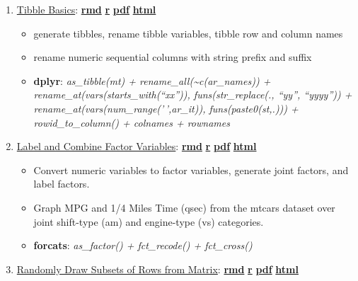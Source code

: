 \documentclass[
]{book}
\providecommand{\tightlist}{%
  \setlength{\itemsep}{0pt}\setlength{\parskip}{0pt}}
\begin{document}
\begin{enumerate}
\def\labelenumi{\arabic{enumi}.}
\tightlist
\item
  \href{https://fanwangecon.github.io/R4Econ/amto/tibble/htmlpdfr/fs_tib_basics.html}{Tibble Basics}: \href{https://github.com/FanWangEcon/R4Econ/blob/master/amto/tibble//fs_tib_basics.Rmd}{\textbf{rmd}} \textbar{} \href{https://github.com/FanWangEcon/R4Econ/blob/master/amto/tibble/htmlpdfr/fs_tib_basics.R}{\textbf{r}} \textbar{} \href{https://github.com/FanWangEcon/R4Econ/blob/master/amto/tibble/htmlpdfr/fs_tib_basics.pdf}{\textbf{pdf}} \textbar{} \href{https://fanwangecon.github.io/R4Econ/amto/tibble/htmlpdfr/fs_tib_basics.html}{\textbf{html}}

  \begin{itemize}
  \tightlist
  \item
    generate tibbles, rename tibble variables, tibble row and column names
  \item
    rename numeric sequential columns with string prefix and suffix
  \item
    \textbf{dplyr}: \emph{as\_tibble(mt) + rename\_all(\textasciitilde c(ar\_names)) + rename\_at(vars(starts\_with(``xx'')), funs(str\_replace(., ``yy'', ``yyyy'')) + rename\_at(vars(num\_range('\,',ar\_it)), funs(paste0(st,.))) + rowid\_to\_column() + colnames + rownames}
  \end{itemize}
\item
  \href{https://fanwangecon.github.io/R4Econ/amto/tibble/htmlpdfr/fs_tib_factors.html}{Label and Combine Factor Variables}: \href{https://github.com/FanWangEcon/R4Econ/blob/master/amto/tibble//fs_tib_factors.Rmd}{\textbf{rmd}} \textbar{} \href{https://github.com/FanWangEcon/R4Econ/blob/master/amto/tibble/htmlpdfr/fs_tib_factors.R}{\textbf{r}} \textbar{} \href{https://github.com/FanWangEcon/R4Econ/blob/master/amto/tibble/htmlpdfr/fs_tib_factors.pdf}{\textbf{pdf}} \textbar{} \href{https://fanwangecon.github.io/R4Econ/amto/tibble/htmlpdfr/fs_tib_factors.html}{\textbf{html}}

  \begin{itemize}
  \tightlist
  \item
    Convert numeric variables to factor variables, generate joint factors, and label factors.
  \item
    Graph MPG and 1/4 Miles Time (qsec) from the mtcars dataset over joint shift-type (am) and engine-type (vs) categories.
  \item
    \textbf{forcats}: \emph{as\_factor() + fct\_recode() + fct\_cross()}
  \end{itemize}
\item
  \href{https://fanwangecon.github.io/R4Econ/amto/tibble/htmlpdfr/fs_tib_random_draws.html}{Randomly Draw Subsets of Rows from Matrix}: \href{https://github.com/FanWangEcon/R4Econ/blob/master/amto/tibble//fs_tib_random_draws.Rmd}{\textbf{rmd}} \textbar{} \href{https://github.com/FanWangEcon/R4Econ/blob/master/amto/tibble/htmlpdfr/fs_tib_random_draws.R}{\textbf{r}} \textbar{} \href{https://github.com/FanWangEcon/R4Econ/blob/master/amto/tibble/htmlpdfr/fs_tib_random_draws.pdf}{\textbf{pdf}} \textbar{} \href{https://fanwangecon.github.io/R4Econ/amto/tibble/htmlpdfr/fs_tib_random_draws.html}{\textbf{html}}


\end{enumerate}
\end{document}
